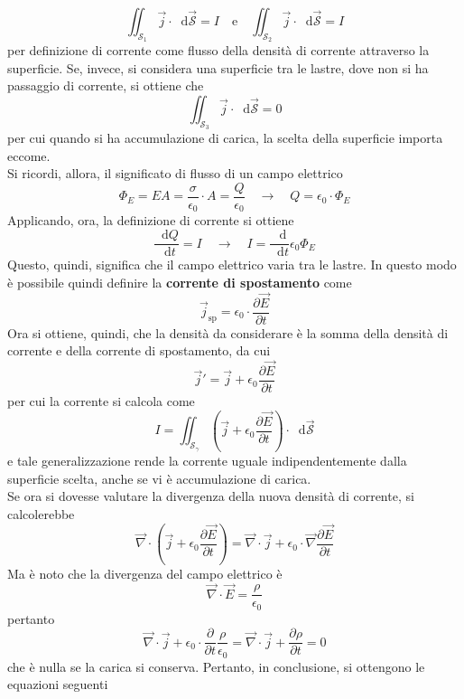 \documentclass[a4paper]{extarticle}
\newcommand\dif{\mathop{}\!\mathrm{d}}
\begin{document}
\[\iint_{\mathcal{S}_1} \vec j \cdot \dif \vec{\mathcal{S}} = I \hspace{1em} \text{e} \hspace{1em} \iint_{\mathcal{S}_2} \vec j \cdot \dif \vec{\mathcal{S}} = I\]
per definizione di corrente come flusso della densità di corrente attraverso la superficie. Se, invece, si considera una superficie tra le lastre, dove non si ha passaggio di corrente, si ottiene che
\[\iint_{\mathcal{S}_3} \vec j \cdot \dif \vec{\mathcal{S}} = 0\]
per cui quando si ha accumulazione di carica, la scelta della superficie importa eccome.\\
Si ricordi, allora, il significato di flusso di un campo elettrico
\[\Phi_E = E A = \dfrac{\sigma}{\epsilon_0} \cdot A = \dfrac{Q}{\epsilon_0} \hspace{1em} \rightarrow \hspace{1em} Q = \epsilon_0 \cdot \Phi_E\]
Applicando, ora, la definizione di corrente si ottiene
\[\dfrac{\dif Q}{\dif t} = I \hspace{1em} \rightarrow \hspace{1em} I = \dfrac{\dif }{\dif t} \epsilon_0 \Phi_E\]
Questo, quindi, significa che il campo elettrico varia tra le lastre. In questo modo è possibile quindi definire la \textbf{corrente di spostamento} come
\[\vec j_\text{sp} = \epsilon_0 \cdot \dfrac{\partial \vec E}{\partial t}\]
Ora si ottiene, quindi, che la densità da considerare è la somma della densità di corrente e della corrente di spostamento, da cui
\[\vec j' = \vec j + \epsilon_0 \dfrac{\partial \vec E}{\partial t}\]
per cui la corrente si calcola come
\[I=\iint_{\mathcal{S}_\gamma} \left(\vec j + \epsilon_0 \dfrac{\partial \vec E}{\partial t}\right) \cdot \dif \vec{\mathcal{S}}\]
e tale generalizzazione rende la corrente uguale indipendentemente dalla superficie scelta, anche se vi è accumulazione di carica.\\
Se ora si dovesse valutare la divergenza della nuova densità di corrente, si calcolerebbe
\[\vec \nabla \cdot \left(\vec j + \epsilon_0 \dfrac{\partial \vec E}{\partial t}\right) = \vec \nabla \cdot \vec j + \epsilon_0 \cdot \vec \nabla \dfrac{\partial \vec E}{\partial t}\]
Ma è noto che la divergenza del campo elettrico è
\[\vec \nabla \cdot \vec E = \dfrac{\rho}{\epsilon_0}\]
pertanto
\[\vec \nabla \cdot \vec j + \epsilon_0 \cdot \frac{\partial}{\partial t} \dfrac{\rho}{\epsilon_0} = \vec \nabla \cdot \vec j + \frac{\partial \rho}{\partial t} = 0\]
che è nulla se la carica si conserva. Pertanto, in conclusione, si ottengono le equazioni seguenti
\end{document}
